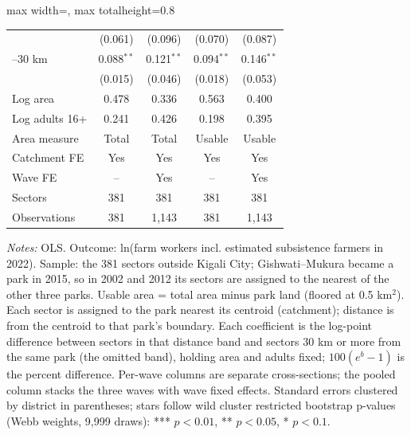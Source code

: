 \documentclass[11pt]{article}
\begin{document}
\begin{table}[H]
\begin{adjustbox}{max width=\textwidth, max totalheight=0.8\textheight}
\begin{tabular}{lcccc}
 & (0.061) & (0.096) & (0.070) & (0.087) \\
\quad 25--30 km & 0.088$^{**}$ & 0.121$^{**}$ & 0.094$^{**}$ & 0.146$^{**}$ \\
 & (0.015) & (0.046) & (0.018) & (0.053) \\
\addlinespace
\midrule
Log area & 0.478 & 0.336 & 0.563 & 0.400 \\
Log adults 16+ & 0.241 & 0.426 & 0.198 & 0.395 \\
Area measure & Total & Total & Usable & Usable \\
Catchment FE & Yes & Yes & Yes & Yes \\
Wave FE & -- & Yes & -- & Yes \\
Sectors & 381 & 381 & 381 & 381 \\
Observations & 381 & 1,143 & 381 & 1,143 \\
\bottomrule
\end{tabular}
\end{adjustbox}
\begin{minipage}{0.97\textwidth}\scriptsize
\textit{Notes:} OLS. Outcome: ln(farm workers incl. estimated subsistence farmers in 2022). Sample: the 381 sectors outside Kigali City; Gishwati--Mukura became a park in 2015, so in 2002 and 2012 its sectors are assigned to the nearest of the other three parks. Usable area = total area minus park land (floored at 0.5 km$^2$). Each sector is assigned to the park nearest its centroid (catchment); distance is from the centroid to that park's boundary. Each coefficient is the log-point difference between sectors in that distance band and sectors 30 km or more from the same park (the omitted band), holding area and adults fixed; $100(e^{b}-1)$ is the percent difference. Per-wave columns are separate cross-sections; the pooled column stacks the three waves with wave fixed effects. Standard errors clustered by district in parentheses; stars follow wild cluster restricted bootstrap p-values (Webb weights, 9,999 draws): *** $p<0.01$, ** $p<0.05$, * $p<0.1$.
\end{minipage}
\end{table}
\clearpage
\end{document}
